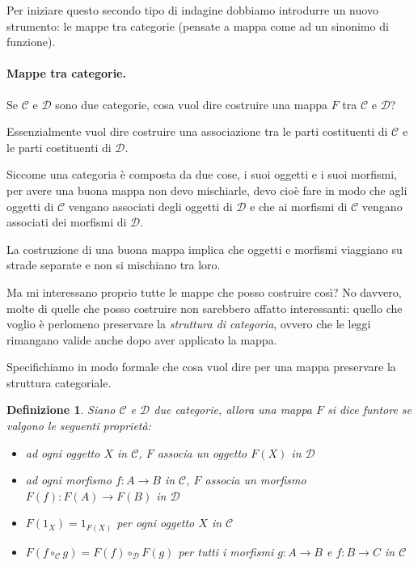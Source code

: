 \documentclass[12pt]{article}
\newtheorem{definition}{Definizione}
\begin{document}
Per iniziare questo secondo tipo di indagine dobbiamo introdurre un nuovo strumento: le mappe tra categorie
(pensate a mappa come ad un sinonimo di funzione).

\paragraph{Mappe tra categorie.} Se $\mathcal{C}$ e $\mathcal{D}$ sono due categorie, cosa vuol dire costruire una mappa $F$ tra $\mathcal{C}$ e $\mathcal{D}$?

Essenzialmente vuol dire costruire una associazione tra le parti costituenti di $\mathcal{C}$ e le parti costituenti di $\mathcal{D}$.

Siccome una categoria è composta da due cose, i suoi oggetti e i suoi morfismi, per avere una buona mappa non devo mischiarle,
devo cioè fare in modo che agli oggetti di $\mathcal{C}$ vengano associati degli oggetti di $\mathcal{D}$ e che ai morfismi di
$\mathcal{C}$ vengano associati dei morfismi di $\mathcal{D}$.

La costruzione di una buona mappa implica che oggetti e morfismi viaggiano su strade separate e non si mischiano tra loro.

Ma mi interessano proprio tutte le mappe che posso costruire così? No davvero, molte di quelle che posso costruire
non sarebbero affatto interessanti: quello che voglio è perlomeno preservare la \emph{struttura di categoria},
ovvero che le leggi rimangano valide anche dopo aver applicato la mappa.

Specifichiamo in modo formale che cosa vuol dire per una mappa preservare la struttura categoriale.

\begin{definition}
Siano $\mathcal{C}$ e $\mathcal{D}$ due categorie, allora una mappa $F$ si dice \emph{funtore} se valgono le seguenti proprietà:

\begin{itemize}
  \item ad ogni oggetto $X$ in $\mathcal{C}$, $F$ associa un oggetto $F(X)$ in $\mathcal{D}$
  \item ad ogni morfismo $f: A \rightarrow B$ in $\mathcal{C}$, $F$ associa un morfismo $F(f): F(A) \rightarrow F(B)$ in $\mathcal{D}$
  \item $F(1_X) = 1_{F(X)}$ per ogni oggetto $X$ in $\mathcal{C}$
  \item $F(f \circ_\mathcal{C} g) = F(f) \circ_\mathcal{D} F(g)$ per tutti i morfismi $g: A \rightarrow B$ e $f: B \rightarrow C$ in $\mathcal{C}$
\end{itemize}

\end{definition}
\end{document}
